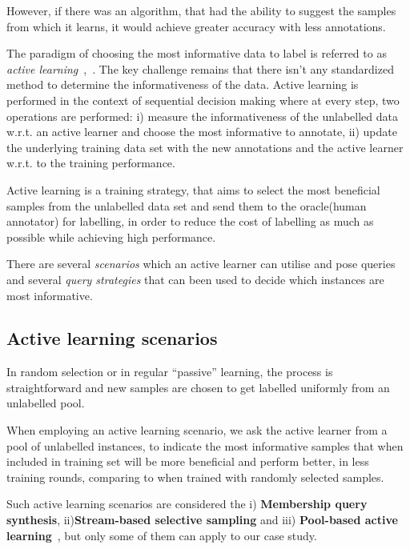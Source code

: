 However, if there was an algorithm, that had the ability to suggest the samples from which it learns, it would achieve greater accuracy with less annotations.


The paradigm of choosing the most informative data to label is referred to as \textit{active learning}~\cite{cohn1996active},~\cite{settles2009active}. The key challenge remains that there isn't any standardized method to determine the informativeness of the data. Active learning is performed in the context of sequential decision making where at every step, two operations are performed: i) measure the informativeness of the unlabelled data w.r.t. an active learner and choose the most informative to annotate, ii) update the underlying training data set with the new annotations and the active learner w.r.t. to the training performance.

Active learning is a training strategy, that aims to select the most beneficial samples from the unlabelled data set and send them to the oracle(human annotator) for labelling, in order to reduce the cost of labelling as much as possible while achieving high performance.

There are several \textit{scenarios} which an active learner can utilise and pose queries and several \textit{query strategies} that can been used to decide which instances are most informative.

\subsection{Active learning scenarios}

In random selection or in regular ``passive'' learning, the process is straightforward and new samples are chosen to get labelled uniformly from an unlabelled pool.

When employing an active learning scenario, we ask the active learner from a pool of unlabelled instances, to indicate the most informative samples that when included in training set will be more beneficial and perform better, in less training rounds, comparing to when trained with randomly selected samples.

Such active learning scenarios are considered the i) \textbf{Membership query synthesis}, ii)\textbf{Stream-based selective sampling} and iii) \textbf{Pool-based active learning}~\cite{settles2009active}, but only some of them can apply to our case study.

